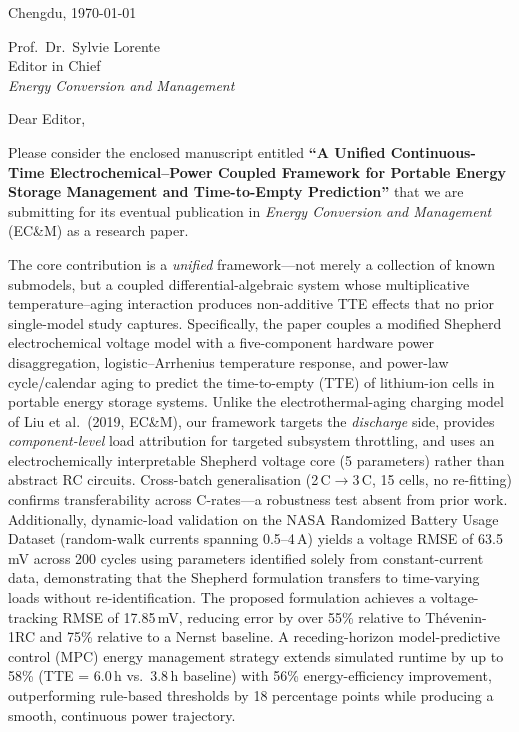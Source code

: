 \documentclass[12pt]{article}
\begin{document}
\begin{flushright}
Chengdu, \today
\end{flushright}

\noindent
Prof.\ Dr.\ Sylvie Lorente\\
Editor in Chief\\
\emph{Energy Conversion and Management}

\bigskip
\noindent Dear Editor,

Please consider the enclosed manuscript entitled \textbf{``A Unified Continuous-Time Electrochemical--Power Coupled Framework for Portable Energy Storage Management and Time-to-Empty Prediction''} that we are submitting for its eventual publication in \emph{Energy Conversion and Management} (EC\&M) as a research paper.

The core contribution is a \emph{unified} framework---not merely a collection of known submodels, but a coupled differential-algebraic system whose multiplicative temperature--aging interaction produces non-additive TTE effects that no prior single-model study captures.
Specifically, the paper couples a modified Shepherd electrochemical voltage model with a five-component hardware power disaggregation, logistic--Arrhenius temperature response, and power-law cycle/calendar aging to predict the time-to-empty (TTE) of lithium-ion cells in portable energy storage systems.
Unlike the electrothermal-aging charging model of Liu et al.\ (2019, EC\&M), our framework targets the \emph{discharge} side, provides \emph{component-level} load attribution for targeted subsystem throttling, and uses an electrochemically interpretable Shepherd voltage core (5 parameters) rather than abstract RC circuits.
Cross-batch generalisation (2\,C$\to$3\,C, 15 cells, no re-fitting) confirms transferability across C-rates---a robustness test absent from prior work.
Additionally, dynamic-load validation on the NASA Randomized Battery Usage Dataset (random-walk currents spanning 0.5--4\,A) yields a voltage RMSE of 63.5\,mV across 200 cycles using parameters identified solely from constant-current data, demonstrating that the Shepherd formulation transfers to time-varying loads without re-identification.
The proposed formulation achieves a voltage-tracking RMSE of 17.85\,mV, reducing error by over 55\% relative to Th\'{e}venin-1RC and 75\% relative to a Nernst baseline.
A receding-horizon model-predictive control (MPC) energy management strategy extends simulated runtime by up to 58\% (TTE = 6.0\,h vs.\ 3.8\,h baseline) with 56\% energy-efficiency improvement, outperforming rule-based thresholds by 18 percentage points while producing a smooth, continuous power trajectory.
\end{document}
